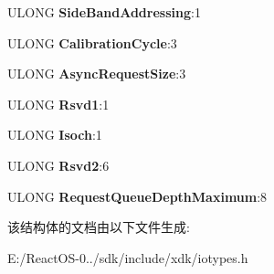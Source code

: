 \begin{DoxyCompactItemize}
U\+L\+O\+NG {\bfseries Side\+Band\+Addressing}\+:1
\item 
\mbox{\label{struct___p_c_i___a_g_p___c_a_p_a_b_i_l_i_t_y_1_1___p_c_i___a_g_p___s_t_a_t_u_s_abdfcd4327f9607b23281cadc91806b3a}} 
U\+L\+O\+NG {\bfseries Calibration\+Cycle}\+:3
\item 
\mbox{\label{struct___p_c_i___a_g_p___c_a_p_a_b_i_l_i_t_y_1_1___p_c_i___a_g_p___s_t_a_t_u_s_aaf79aa222e56a09fbe985428fff3acbd}} 
U\+L\+O\+NG {\bfseries Async\+Request\+Size}\+:3
\item 
\mbox{\label{struct___p_c_i___a_g_p___c_a_p_a_b_i_l_i_t_y_1_1___p_c_i___a_g_p___s_t_a_t_u_s_a087fc37cef40ad3056cd8ae721b23b9c}} 
U\+L\+O\+NG {\bfseries Rsvd1}\+:1
\item 
\mbox{\label{struct___p_c_i___a_g_p___c_a_p_a_b_i_l_i_t_y_1_1___p_c_i___a_g_p___s_t_a_t_u_s_a1e0d6dafa0d6283e0094dfb2638d7f19}} 
U\+L\+O\+NG {\bfseries Isoch}\+:1
\item 
\mbox{\label{struct___p_c_i___a_g_p___c_a_p_a_b_i_l_i_t_y_1_1___p_c_i___a_g_p___s_t_a_t_u_s_aa69bc92a545bd0a2361a45dbdc7951e3}} 
U\+L\+O\+NG {\bfseries Rsvd2}\+:6
\item 
\mbox{\label{struct___p_c_i___a_g_p___c_a_p_a_b_i_l_i_t_y_1_1___p_c_i___a_g_p___s_t_a_t_u_s_a9c7c39955b62a221f40ae9521bfdaebd}} 
U\+L\+O\+NG {\bfseries Request\+Queue\+Depth\+Maximum}\+:8
\end{DoxyCompactItemize}


该结构体的文档由以下文件生成\+:\begin{DoxyCompactItemize}
\item 
E\+:/\+React\+O\+S-\/0../sdk/include/xdk/iotypes.\+h\end{DoxyCompactItemize}
